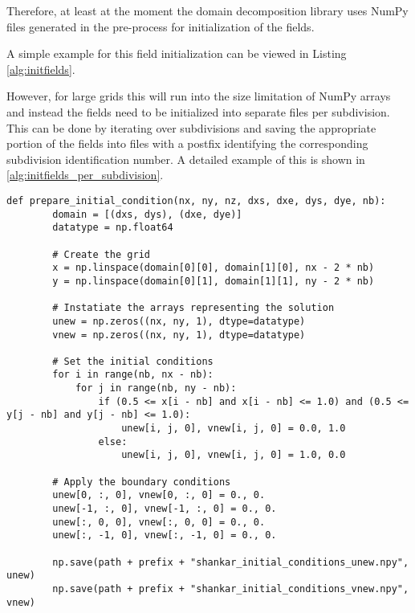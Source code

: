 Therefore, at least at the moment the domain decomposition library uses NumPy files generated in the pre-process for initialization of the fields.

A simple example for this field initialization can be viewed in Listing \ref{alg:initfields}.

However, for large grids this will run into the size limitation of NumPy arrays and instead the fields need to be initialized into separate files per subdivision.
This can be done by iterating over subdivisions and saving the appropriate portion of the fields into files with a postfix identifying the corresponding subdivision identification number.
A detailed example of this is shown in \ref{alg:initfields_per_subdivision}.

\begin{lstlisting}[caption={Example code of the domain pre-process function to initialize the fields "unew" and "vnew" for the Shankar use case.},captionpos=b, label={alg:initfields}, float, floatplacement=H]
def prepare_initial_condition(nx, ny, nz, dxs, dxe, dys, dye, nb):
        domain = [(dxs, dys), (dxe, dye)]
        datatype = np.float64

        # Create the grid
        x = np.linspace(domain[0][0], domain[1][0], nx - 2 * nb)
        y = np.linspace(domain[0][1], domain[1][1], ny - 2 * nb)

        # Instatiate the arrays representing the solution
        unew = np.zeros((nx, ny, 1), dtype=datatype)
        vnew = np.zeros((nx, ny, 1), dtype=datatype)

        # Set the initial conditions
        for i in range(nb, nx - nb):
            for j in range(nb, ny - nb):
                if (0.5 <= x[i - nb] and x[i - nb] <= 1.0) and (0.5 <= y[j - nb] and y[j - nb] <= 1.0):
                    unew[i, j, 0], vnew[i, j, 0] = 0.0, 1.0
                else:
                    unew[i, j, 0], vnew[i, j, 0] = 1.0, 0.0

        # Apply the boundary conditions
        unew[0, :, 0], vnew[0, :, 0] = 0., 0.
        unew[-1, :, 0], vnew[-1, :, 0] = 0., 0.
        unew[:, 0, 0], vnew[:, 0, 0] = 0., 0.
        unew[:, -1, 0], vnew[:, -1, 0] = 0., 0.

        np.save(path + prefix + "shankar_initial_conditions_unew.npy", unew)
        np.save(path + prefix + "shankar_initial_conditions_vnew.npy", vnew)
\end{lstlisting}

